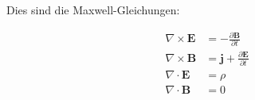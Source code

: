\documentclass[fleqn]{scrartcl}
\begin{document}
Dies sind die Maxwell-Gleichungen:
\begin{spreadlines}{\baselineskip}
\begin{align}
	\nabla \times \pmb{E} &= -\frac{\partial  \pmb{B}}{\partial t} \\
	\nabla \times \pmb{B} &= \pmb{j} + \frac{\partial  \pmb{E}}{\partial t} \\
	\nabla \cdot \pmb{E} &= \rho \\
	\nabla \cdot \pmb{B} &= 0 
\end{align}
\end{spreadlines}
\end{document}
